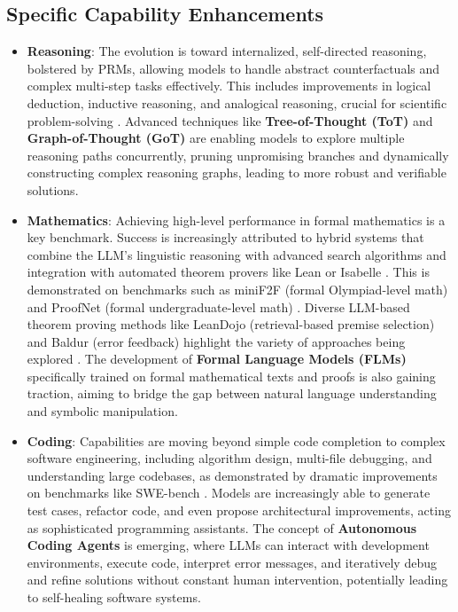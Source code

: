 \documentclass{article}
\begin{document}
\subsection{Specific Capability Enhancements}
\begin{itemize}
    \item \textbf{Reasoning}: The evolution is toward internalized, self-directed reasoning, bolstered by PRMs, allowing models to handle abstract counterfactuals and complex multi-step tasks effectively. This includes improvements in logical deduction, inductive reasoning, and analogical reasoning, crucial for scientific problem-solving \cite{huang2022towards}. Advanced techniques like \textbf{Tree-of-Thought (ToT)} \cite{yao2023treeofthought} and \textbf{Graph-of-Thought (GoT)} \cite{besta2023graphofthought} are enabling models to explore multiple reasoning paths concurrently, pruning unpromising branches and dynamically constructing complex reasoning graphs, leading to more robust and verifiable solutions.
    \item \textbf{Mathematics}: Achieving high-level performance in formal mathematics is a key benchmark. Success is increasingly attributed to hybrid systems that combine the LLM's linguistic reasoning with advanced search algorithms and integration with automated theorem provers like Lean or Isabelle \cite{trinh2024solving, polu2023formal}. This is demonstrated on benchmarks such as miniF2F (formal Olympiad-level math) and ProofNet (formal undergraduate-level math) \cite{polu2023formal}. Diverse LLM-based theorem proving methods like LeanDojo (retrieval-based premise selection) and Baldur (error feedback) highlight the variety of approaches being explored \cite{polu2023formal}. The development of \textbf{Formal Language Models (FLMs)} specifically trained on formal mathematical texts and proofs is also gaining traction, aiming to bridge the gap between natural language understanding and symbolic manipulation.
    \item \textbf{Coding}: Capabilities are moving beyond simple code completion to complex software engineering, including algorithm design, multi-file debugging, and understanding large codebases, as demonstrated by dramatic improvements on benchmarks like SWE-bench \cite{swebench}. Models are increasingly able to generate test cases, refactor code, and even propose architectural improvements, acting as sophisticated programming assistants. The concept of \textbf{Autonomous Coding Agents} is emerging, where LLMs can interact with development environments, execute code, interpret error messages, and iteratively debug and refine solutions without constant human intervention, potentially leading to self-healing software systems.
\end{itemize}
\end{document}
